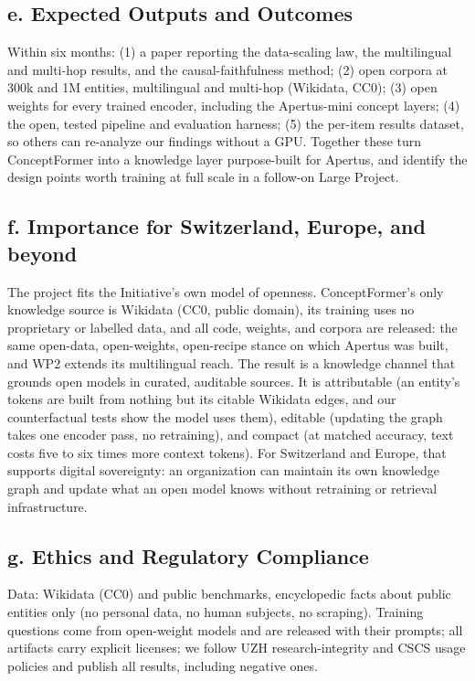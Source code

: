 \documentclass[11pt,a4paper]{article}
\begin{document}
\subsection*{e. Expected Outputs and Outcomes}
Within six months: (1) a paper reporting the data-scaling law, the multilingual and multi-hop
results, and the causal-faithfulness method; (2) open corpora at 300k and 1M entities, multilingual
and multi-hop (Wikidata, CC0); (3) open weights for every trained encoder, including the
Apertus-mini concept layers; (4) the open, tested pipeline and evaluation harness; (5) the
per-item results dataset, so others can re-analyze our findings without a GPU. Together these turn
ConceptFormer into a knowledge layer purpose-built for Apertus, and identify the design points
worth training at full scale in a follow-on Large Project.

\subsection*{f. Importance for Switzerland, Europe, and beyond}
The project fits the Initiative's own model of openness. ConceptFormer's only knowledge source is
Wikidata (CC0, public domain), its training uses no proprietary or labelled data, and all code,
weights, and corpora are released: the same open-data, open-weights, open-recipe stance on which
Apertus was built, and WP2 extends its multilingual reach. The result is a knowledge channel that
grounds open models in curated, auditable sources. It is attributable (an entity's tokens are
built from nothing but its citable Wikidata edges, and our counterfactual tests show the model
uses them), editable (updating the graph takes one encoder pass, no retraining), and compact (at matched accuracy, text costs five to six times more context
tokens). For Switzerland and Europe, that supports digital sovereignty: an organization can
maintain its own knowledge graph and update what an open model knows without retraining or
retrieval infrastructure.

\subsection*{g. Ethics and Regulatory Compliance}
Data: Wikidata (CC0) and public benchmarks, encyclopedic facts about public entities only (no
personal data, no human subjects, no scraping). Training questions come from open-weight models and
are released with their prompts; all artifacts carry explicit licenses; we follow UZH
research-integrity and CSCS usage policies and publish all results, including negative ones.
\end{document}
